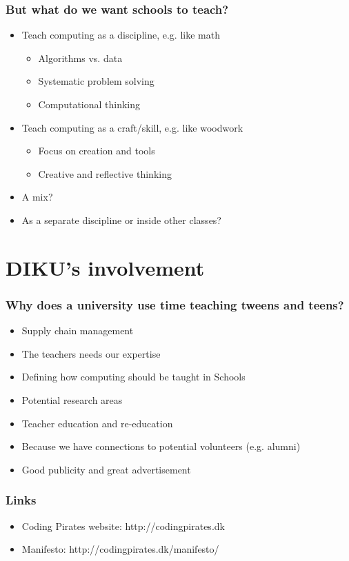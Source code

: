 \documentclass{beamer}
\begin{document}
\begin{frame}
  \frametitle{But what do we want schools to teach?}

  \begin{itemize}
  \item Teach computing as a discipline, e.g. like math
    \begin{itemize}
    \item Algorithms vs. data
    \item Systematic problem solving
    \item Computational thinking
    \end{itemize}
  \item Teach computing as a craft/skill, e.g. like woodwork
    \begin{itemize}
    \item Focus on creation and tools
    \item Creative and reflective thinking
    \end{itemize}
  \item A mix?
  \item As a separate discipline or inside other classes?
  \end{itemize}
\end{frame}

\section{DIKU's involvement}
\begin{frame}
\frametitle{Why does a university use time teaching tweens and teens?}
\begin{itemize}
\item Supply chain management
\item The teachers needs our expertise
\item Defining how computing should be taught in Schools
\item Potential research areas
\item Teacher education and re-education
\item Because we have connections to potential volunteers (e.g. alumni)
\item Good publicity and great advertisement
\end{itemize}
\end{frame}

\begin{frame}
  \frametitle{Links}
  \begin{itemize}
  \item Coding Pirates website: http://codingpirates.dk
  \item Manifesto: http://codingpirates.dk/manifesto/
  \end{itemize}
\end{frame}
\end{document}
